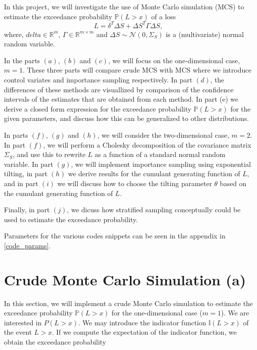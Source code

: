 \documentclass{article}
\begin{document}
In this project, we will investigate the use of Monte Carlo simulation (MCS)  to estimate the exceedance probability $\mathbb{P}(L > x)$ of a loss $$ L = \delta^T\Delta S + \Delta S^T\Gamma\Delta S,$$
where, $delta \in \mathbb{R}^m$, $\Gamma \in \mathbb{R}^{m\times m}$ and $\Delta S \sim \mathcal{N}(0, \Sigma_S)$ is a (multivariate) normal random variable. \vspace{.5cm}

In the parts $(a)$, $(b)$ and $(c)$, we will focus on the one-dimensional case, $m= 1$. These three parts will compare crude MCS with MCS where we introduce control variates and importance sampling respectively. In part $(d)$, the differences of these methods are visuallized by comparison of the confidence intervals of the estimates that are obtained from each method.
In part (e) we derive a closed form expression for the exceedance probability $\mathbb{P}(L > x)$ for the given parameters, and discuss how this can be generalized to other distributions. 

 \vspace{.5cm}
In parts $(f)$, $(g)$ and $(h)$, we will consider the two-dimensional case, $m = 2$. In part $(f)$, we will perform a Cholesky decomposition of the covariance matrix $\Sigma_S$, and use this to rewrite $L$ as a function of a standard normal random variable. In part $(g)$, we will implement importance sampling using exponential tilting, in part $(h)$ we derive results for the cumulant generating function of $L$, and in part $(i)$ we will discuss how to choose the tilting parameter $\theta$ based on the cumulant generating function of $L$. \vspace{.5cm}

Finally, in part $(j)$, we dicuss how stratified sampling conceptually could be used to estimate the exceedance probability.


Parameters for the various codes snippets can be seen in the appendix in \autoref{code_params}.

\section{Crude Monte Carlo Simulation (a)}
In this section, we will implement a crude Monte Carlo simulation to estimate the exceedance probability $\mathbb{P}(L > x)$ for the one-dimensional case ($m=1$). We are interested in ${P}(L > x)$. We may introduce the indicator function $\mathbb{I}(L > x)$ of the event $L > x$. If we compute the expectation of the indicator function, we obtain the exceedance probability
\end{document}

